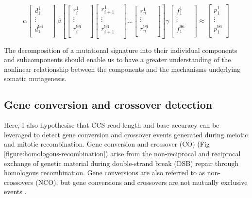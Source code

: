 \begin{equation} \label{eq:4}
\alpha \begin{bmatrix}
    d^{1}_{1}  \\
    \vdots &  \\
    d^{96}_{1}  \\
\end{bmatrix} \
\beta \left[\begin{bmatrix}
    r^{1}_{i} \\
    \vdots &  \\
    r^{96}_{i} \\
\end{bmatrix} 
\begin{bmatrix}
    r^{1}_{i+1} \\
    \vdots &  \\
    r^{96}_{i+1} \\
\end{bmatrix} \ldots 
\begin{bmatrix}
    r^{1}_{n} \\
    \vdots &  \\
    r^{96}_{n} \\
\end{bmatrix}\right]
\gamma \begin{bmatrix}
    f^{1}_{1}  \\
    \vdots &  \\
    f^{96}_{1}  \\
\end{bmatrix} \approx
\begin{bmatrix}
    p^{1}_{1} \\
    \vdots \\
    p^{96}_{1} \\
\end{bmatrix}
\end{equation}

The decomposition of a mutational signature into their individual components and subcomponents should enable us to have a greater understanding of the nonlinear relationship between the components and the mechanisms underlying somatic mutagenesis.



\subsection{Gene conversion and crossover detection}

Here, I also hypothesise that CCS read length and base accuracy can be leveraged to detect gene conversion and crossover events generated during meiotic and mitotic recombination. Gene conversion and crossover (CO) (Fig \ref{figure:homologous-recombination}) arise from the non-reciprocal and reciprocal exchange of genetic material during double-strand break (DSB) repair through homologous recombination. Gene conversions are also referred to as non-crossovers (NCO), but gene conversions and crossovers are not mutually exclusive events \cite{Hunter2015-gk}. 

